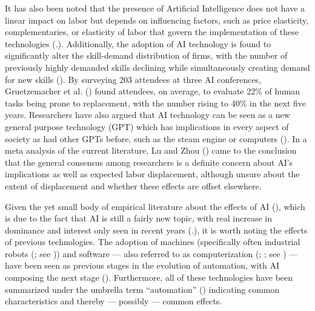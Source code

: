 \documentclass[
  12pt,
  a4paperpaper,
]{article}
\begin{document}
It has also been noted that the presence of Artificial Intelligence does
not have a linear impact on labor but depends on influencing factors,
such as price elasticity, complementaries, or elasticity of labor that
govern the implementation of these technologies
(.). Additionally, the adoption of AI technology is found to
significantly alter the skill-demand distribution of firms, with the
number of previously highly demanded skills declining while
simultaneously creating demand for new skills
(). By
surveying 203 attendees at three AI conferences, Gruetzemacher et al.
() found
attendees, on average, to evaluate 22\% of human tasks being prone to
replacement, with the number rising to 40\% in the next five years.
Researchers have also argued that AI technology can be seen as a new
general purpose technology (GPT) which has implications in every aspect
of society as had other GPTs before, such as the steam engine or
computers (). In a meta analysis of the current literature, Lu
and Zhou () came to the
conclusion that the general consensus among researchers is a definite
concern about AI's implications as well as expected labor displacement,
although unsure about the extent of displacement and whether these
effects are offset elsewhere.

Given the yet small body of empirical literature about the effects of AI
(), which is
due to the fact that AI is still a fairly new topic, with real increase
in dominance and interest only seen in recent years
(.), it
is worth noting the effects of previous technologies. The adoption of
machines (specifically often industrial robots
(; see
)) and
software --- also referred to as computerization
(;
; see
)
--- have been seen as previous stages in the evolution of automation,
with AI composing the next stage
().
Furthermore, all of these technologies have been summarized under the
umbrella term ``automation'' () indicating common characteristics and thereby
--- possibly --- common effects.
\end{document}
